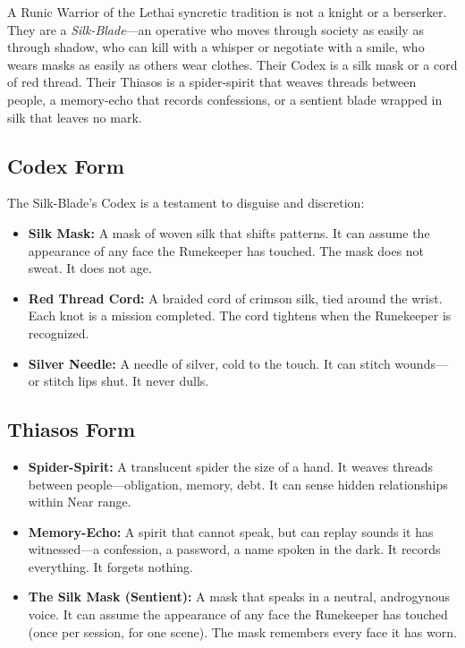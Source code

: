 A Runic Warrior of the Lethai syncretic tradition is not a knight or a berserker. They are a \textit{Silk-Blade}—an operative who moves through society as easily as through shadow, who can kill with a whisper or negotiate with a smile, who wears masks as easily as others wear clothes. Their Codex is a silk mask or a cord of red thread. Their Thiasos is a spider-spirit that weaves threads between people, a memory-echo that records confessions, or a sentient blade wrapped in silk that leaves no mark.

\subsection{Codex Form}

The Silk-Blade's Codex is a testament to disguise and discretion:

\begin{itemize}
\item \textbf{Silk Mask:} A mask of woven silk that shifts patterns. It can assume the appearance of any face the Runekeeper has touched. The mask does not sweat. It does not age.
\item \textbf{Red Thread Cord:} A braided cord of crimson silk, tied around the wrist. Each knot is a mission completed. The cord tightens when the Runekeeper is recognized.
\item \textbf{Silver Needle:} A needle of silver, cold to the touch. It can stitch wounds—or stitch lips shut. It never dulls.
\end{itemize}

\subsection{Thiasos Form}

\begin{itemize}
\item \textbf{Spider-Spirit:} A translucent spider the size of a hand. It weaves threads between people—obligation, memory, debt. It can sense hidden relationships within Near range.
\item \textbf{Memory-Echo:} A spirit that cannot speak, but can replay sounds it has witnessed—a confession, a password, a name spoken in the dark. It records everything. It forgets nothing.
\item \textbf{The Silk Mask (Sentient):} A mask that speaks in a neutral, androgynous voice. It can assume the appearance of any face the Runekeeper has touched (once per session, for one scene). The mask remembers every face it has worn.
\end{itemize}

